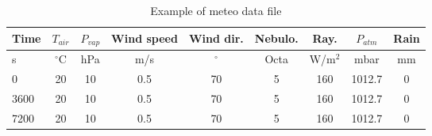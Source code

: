 \begin{table}
    \centering
  \begin{tabular}{|l|c|c|c|c|c|c|c|c|}
     \hline \hline
     Time & $T_{air}$ & $P_{vap}$ & Wind speed & Wind dir. & Nebulo. & Ray. & $P_{atm}$ & Rain \\
     \hline \hline
     s & $^\circ$C & hPa & m/s & $^\circ$ & Octa & W/m$^2$ & mbar & mm \\
     \hline \hline
     0 & 20 & 10 & 0.5 & 70 & 5 & 160 & 1012.7 & 0 \\
     3600 & 20 & 10 & 0.5 & 70 & 5 & 160 & 1012.7 & 0 \\
     7200 & 20 & 10 & 0.5 & 70 & 5 & 160 & 1012.7 & 0 \\
     \hline
   \end{tabular}
  \caption{Example of meteo data file }\label{tab:meteo}
\end{table}
